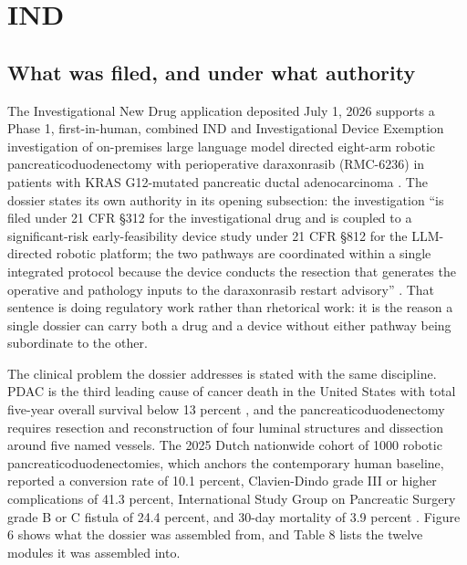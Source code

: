 \section{IND}
\label{sec:ind}

\subsection{What was filed, and under what authority}

The Investigational New Drug application deposited July 1, 2026 supports a Phase
1, first-in-human, combined IND and Investigational Device Exemption
investigation of on-premises large language model directed eight-arm robotic
pancreaticoduodenectomy with perioperative daraxonrasib (RMC-6236) in patients
with KRAS G12-mutated pancreatic ductal adenocarcinoma \cite{phase1ind}. The
dossier states its own authority in its opening subsection: the investigation
``is filed under 21 CFR \S 312 for the investigational drug and is coupled to a
significant-risk early-feasibility device study under 21 CFR \S 812 for the
LLM-directed robotic platform; the two pathways are coordinated within a single
integrated protocol because the device conducts the resection that generates the
operative and pathology inputs to the daraxonrasib restart advisory''
\cite{phase1ind}. That sentence is doing regulatory work rather than rhetorical
work: it is the reason a single dossier can carry both a drug and a device
without either pathway being subordinate to the other.

The clinical problem the dossier addresses is stated with the same discipline.
PDAC is the third leading cause of cancer death in the United States with total
five-year overall survival below 13 percent \cite{siegel2025statistics}, and the
pancreaticoduodenectomy requires resection and reconstruction of four luminal
structures and dissection around five named vessels. The 2025 Dutch nationwide
cohort of 1000 robotic pancreaticoduodenectomies, which anchors the contemporary
human baseline, reported a conversion rate of 10.1 percent, Clavien-Dindo grade
III or higher complications of 41.3 percent, International Study Group on
Pancreatic Surgery grade B or C fistula of 24.4 percent, and 30-day mortality of
3.9 percent \cite{dutchcohort2025, bassi2017isgps}. Figure 6 shows what the
dossier was assembled from, and Table 8 lists the twelve modules it was
assembled into.

